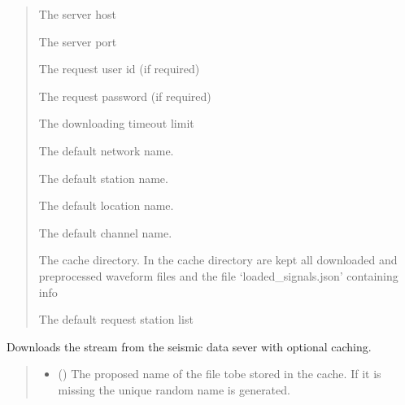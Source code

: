 \documentclass[letterpaper,10pt,english]{sphinxmanual}
\begin{document}
\begin{fulllineitems}
\begin{quote}
\begin{description}
\sphinxAtStartPar
The server host

\sphinxAtStartPar
The server port

\sphinxAtStartPar
The request user id (if required)

\sphinxAtStartPar
The request password (if required)

\sphinxAtStartPar
The downloading timeout limit

\sphinxAtStartPar
The default network name.

\sphinxAtStartPar
The default station name.

\sphinxAtStartPar
The default location name.

\sphinxAtStartPar
The default channel name.

\sphinxAtStartPar
The cache directory. In the cache directory are kept all downloaded and preprocessed waveform files
and the file ‘loaded\_signals.json’ containing info

\sphinxAtStartPar
The default request station list

\end{description}\end{quote}

\begin{fulllineitems}
\label{\detokenize{api_core:core.signal_utils.StreamLoader.download}}
\pysigstartsignatures
{}
\pysigstopsignatures
\sphinxAtStartPar
Downloads the stream from the seismic data sever with optional caching.
\begin{quote}\begin{description}
\begin{itemize}
\item {} 
\sphinxAtStartPar
{} () \textendash{} The proposed name of the file tobe stored in the cache.
If it is missing the unique random name is generated.


\end{itemize}
\end{description}
\end{quote}
\end{fulllineitems}
\end{fulllineitems}
\end{document}
